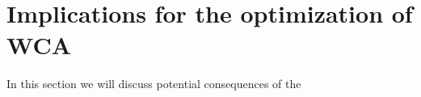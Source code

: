 \section{Implications for the optimization of \acs{WCA}}\label{sec:implications}

In this section we will discuss potential consequences of the 
